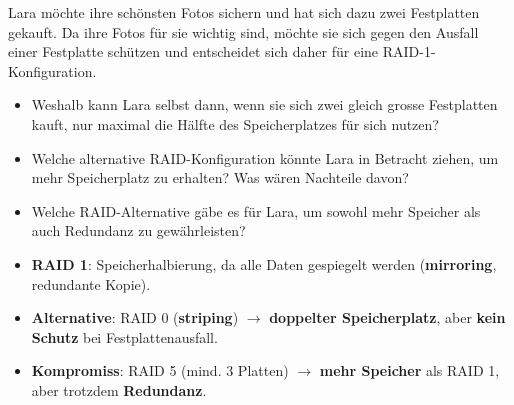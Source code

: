\begin{myexercise}
Lara möchte ihre schönsten Fotos sichern und hat sich dazu zwei Festplatten gekauft. Da ihre Fotos für sie wichtig sind, möchte sie sich gegen den Ausfall einer Festplatte schützen und entscheidet sich daher für eine RAID-1-Konfiguration. 

\begin{itemize}
\item Weshalb kann Lara selbst dann, wenn sie sich zwei gleich grosse Festplatten kauft, nur maximal die Hälfte des Speicherplatzes für sich nutzen?
\item Welche alternative RAID-Konfiguration könnte Lara in Betracht ziehen, um mehr Speicherplatz zu erhalten? Was wären Nachteile davon?
\item Welche RAID-Alternative gäbe es für Lara, um sowohl mehr Speicher als auch Redundanz zu gewährleisten?
\end{itemize}


\begin{myanswer}
\begin{itemize}
\item \textbf{RAID 1}: Speicherhalbierung, da alle Daten gespiegelt werden (\textbf{mirroring}, redundante Kopie).
\item \textbf{Alternative}: RAID 0 (\textbf{striping}) $\rightarrow$ \textbf{doppelter Speicherplatz}, aber \textbf{kein Schutz} bei Festplattenausfall.
\item \textbf{Kompromiss}: RAID 5 (mind. 3 Platten) $\rightarrow$ \textbf{mehr Speicher} als RAID 1, aber trotzdem \textbf{Redundanz}.
\end{itemize}
\end{myanswer}
\end{myexercise}

